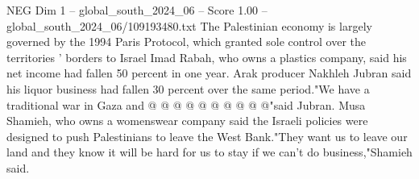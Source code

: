 \begin{textsample}{NEG Dim 1 – global\_south\_2024\_06 – Score 1.00 – global\_south\_2024\_06/109193480.txt}
The Palestinian economy is largely governed by the 1994 Paris Protocol, which granted sole control over the territories ' borders to Israel Imad Rabah, who owns a plastics company, said his net income had fallen 50 percent in one year.
Arak producer Nakhleh Jubran said his liquor business had fallen 30 percent over the same period."We have a traditional war in Gaza and @ @ @ @ @ @ @ @ @ @"said Jubran.
Musa Shamieh, who owns a womenswear company said the Israeli policies were designed to push Palestinians to leave the West Bank."They want us to leave our land and they know it will be hard for us to stay if we can't do business,"Shamieh said.

\end{textsample}

